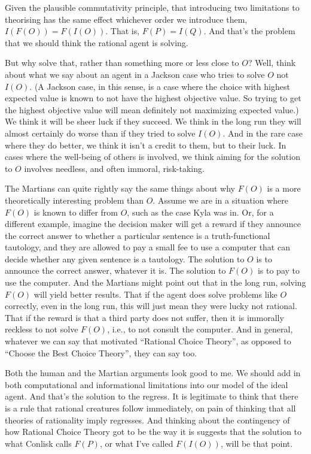 \documentclass[
  11pt,
  letterpaper,
  DIV=11,
  numbers=noendperiod,
  oneside]{scrartcl}
\begin{document}
Given the plausible commutativity principle, that introducing two
limitations to theorising has the same effect whichever order we
introduce them, \(I(F(O)) = F(I(O))\). That is, \(F(P) = I(Q)\). And
that's the problem that we should think the rational agent is solving.

But why solve that, rather than something more or less close to \(O\)?
Well, think about what we say about an agent in a Jackson case who tries
to solve \(O\) not \(I(O)\). (A Jackson case, in this sense, is a case
where the choice with highest expected value is known to not have the
highest objective value. So trying to get the highest objective value
will mean definitely not maximizing expected value.) We think it will be
sheer luck if they succeed. We think in the long run they will almost
certainly do worse than if they tried to solve \(I(O)\). And in the rare
case where they do better, we think it isn't a credit to them, but to
their luck. In cases where the well-being of others is involved, we
think aiming for the solution to \(O\) involves needless, and often
immoral, risk-taking.

The Martians can quite rightly say the same things about why \(F(O)\) is
a more theoretically interesting problem than \(O\). Assume we are in a
situation where \(F(O)\) is known to differ from \(O\), such as the case
Kyla was in. Or, for a different example, imagine the decision maker
will get a reward if they announce the correct answer to whether a
particular sentence is a truth-functional tautology, and they are
allowed to pay a small fee to use a computer that can decide whether any
given sentence is a tautology. The solution to \(O\) is to announce the
correct answer, whatever it is. The solution to \(F(O)\) is to pay to
use the computer. And the Martians might point out that in the long run,
solving \(F(O)\) will yield better results. That if the agent does solve
problems like \(O\) correctly, even in the long run, this will just mean
they were lucky not rational. That if the reward is that a third party
does not suffer, then it is immorally reckless to not solve \(F(O)\),
i.e., to not consult the computer. And in general, whatever we can say
that motivated ``Rational Choice Theory'', as opposed to ``Choose the
Best Choice Theory'', they can say too.

Both the human and the Martian arguments look good to me. We should add
in both computational and informational limitations into our model of
the ideal agent. And that's the solution to the regress. It is
legitimate to think that there is a rule that rational creatures follow
immediately, on pain of thinking that all theories of rationality imply
regresses. And thinking about the contingency of how Rational Choice
Theory got to be the way it is suggests that the solution to what
Conlisk calls \(F(P)\), or what I've called \(F(I(O))\), will be that
point.
\end{document}
